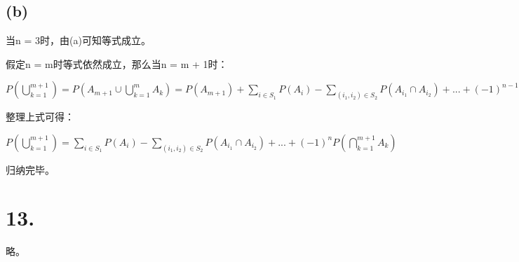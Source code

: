 \documentclass[UTF8]{report}
\begin{document}
        \subsection*{(b)}
            当n = 3时，由(a)可知等式成立。

            假定n = m时等式依然成立，那么当n = m + 1时：

            $P(\bigcup_{k = 1}^{m + 1}) = P(A_{m + 1} \cup \bigcup_{k = 1}^m A_k) = 
            P(A_{m + 1}) + \sum_{i \in S_1}P(A_i) 
            - \sum_{(i_1, i_2) \in S_2}P(A_{i_1} \cap A_{i_2}) + ... + (-1)^{n - 1}P(\bigcap_{k = 1}^{n}A_k) -
            P(A_{m + 1} \cap \bigcup_{k = 1}^m A_k)$

            整理上式可得：

            $P(\bigcup_{k = 1}^{m + 1}) = \sum_{i \in S_1}P(A_i) - \sum_{(i_1, i_2) \in S_2}P(A_{i_1} \cap A_{i_2}) + ... + (-1)^nP(\bigcap_{k = 1}^{m + 1}A_k)$

            归纳完毕。
    \section*{13.}
        略。
\end{document}
